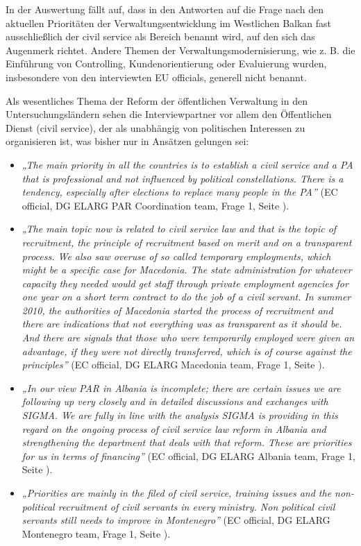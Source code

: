 In der Auswertung fällt auf, dass in den Antworten auf die Frage nach den aktuellen Prioritäten der Verwaltungsentwicklung im Westlichen Balkan fast ausschließlich der civil service als Bereich benannt wird, auf den sich das Augenmerk richtet. Andere Themen der Verwaltungsmodernisierung, wie z. B. die Einführung von Controlling, Kundenorientierung oder Evaluierung wurden, insbesondere von den interviewten EU officials, generell nicht benannt. \par
Als wesentliches Thema der Reform der öffentlichen Verwaltung in den Untersuchungsländern sehen die Interviewpartner vor allem den Öffentlichen Dienst (civil service), der als unabhängig von politischen Interessen zu organisieren ist, was bisher nur in Ansätzen gelungen sei:
\begin{itemize}[label={}]
\item \textit{„The main priority in all the countries is to establish a civil service and a PA that is professional and not influenced by political constellations. There is a tendency, especially after elections to replace many people in the PA”} (EC official, DG ELARG PAR Coordination team, Frage 1, Seite \pageref{sec:there}).
\item \textit{„The main topic now is related to civil service law and that is the topic of recruitment, the principle of recruitment based on merit and on a transparent process. We also saw overuse of so called temporary employments, which might be a specific case for Macedonia. The state administration for whatever capacity they needed would get staff through private employment agencies for one year on a short term contract to do the job of a civil servant. In summer 2010, the authorities of Macedonia started the process of recruitment and there are indications that not everything was as transparent as it should be. And there are signals that those who were temporarily employed were given an advantage, if they were not directly transferred, which is of course against the principles”} (EC official, DG ELARG Macedonia team, Frage 1, Seite \pageref{sec:there}).
\item \textit{„In our view PAR in Albania is incomplete; there are certain issues we are following up very closely and in detailed discussions and exchanges with SIGMA. We are fully in line with the analysis SIGMA is providing in this regard on the ongoing process of civil service law reform in Albania and strengthening the department that deals with that reform. These are priorities for us in terms of financing”} (EC official, DG ELARG Albania team, Frage 1, Seite \pageref{sec:there}).
\item \textit{„Priorities are mainly in the filed of civil service, training issues and the non-political recruitment of civil servants in every ministry. Non political civil servants still needs to improve in Montenegro”} (EC official, DG ELARG Montenegro team, Frage 1, Seite \pageref{sec:there}).
\end{itemize}
